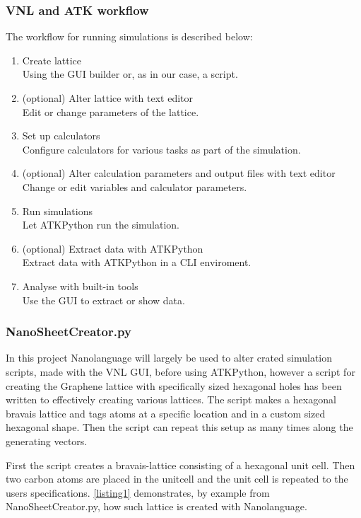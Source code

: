 \subsubsection{VNL and ATK workflow}
The workflow for running simulations is described below:
\begin{enumerate}
 \item Create lattice\\
       Using the GUI builder or, as in our case, a script.
 \item (optional) Alter lattice with text editor\\
       Edit or change parameters of the lattice.
 \item Set up calculators\\
       Configure calculators for various tasks as part of the simulation.
 \item (optional) Alter calculation parameters and output files with text editor\\
       Change or edit variables and calculator parameters.
 \item Run simulations\\
       Let ATKPython run the simulation.
 \item (optional) Extract data with ATKPython\\
       Extract data with ATKPython in a CLI enviroment.
 \item Analyse with built-in tools\\
       Use the GUI to extract or show data.
\end{enumerate}
\subsubsection{NanoSheetCreator.py}
In this project Nanolanguage will largely be used to alter crated simulation scripts, made with the VNL GUI, before using ATKPython, however a script for creating the Graphene lattice with specifically sized hexagonal holes has been written to effectively creating various lattices. The script makes a hexagonal bravais lattice and tags atoms at a specific location and in a custom sized hexagonal shape. Then the script can repeat this setup as many times along the generating vectors.

First the script creates a bravais-lattice consisting of a hexagonal unit cell. Then two carbon atoms are placed in the unitcell and the unit cell is repeated to the users specifications. \cref{listing1} demonstrates, by example from NanoSheetCreator.py, how such lattice is created with Nanolanguage.
\onecolumngrid


